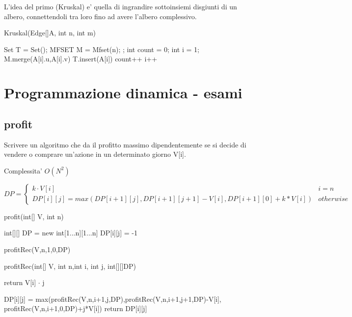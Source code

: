 \documentclass[oneside]{book}
\begin{document}
L'idea del primo (Kruskal) e' quella di ingrandire sottoinsiemi disgiunti di un albero, connettendoli tra loro fino ad avere l'albero complessivo.

\begin{algorithm}
\caption{Kruskal(Edge[]A, int n, int m)\label{alg:cap}}

\begin{algorithmic}
\State Set T = Set();
\State MFSET M = Mfset(n);
;
\State int count = 0;
\State int i = 1;
	\State M.merge(A[i].u,A[i].v)
	\State T.insert(A[i])
	\State count++
	\EndIf
	\State i++
\EndWhile

\end{algorithmic}
\end{algorithm}



\chapter{Programmazione dinamica - esami}
\section{profit}
Scrivere un algoritmo che da il profitto massimo dipendentemente se si decide di vendere o comprare un'azione in un determinato giorno V[i].

Complessita' $O(N^2)$

\begin{equation}
DP =
	\begin{cases}
		k \cdot V[i] & i = n \\
		DP[i][j] = max(DP[i+1][j], DP[i+1][j+1] - V[i], DP[i+1][0]+k*V[i]) & otherwise
	\end{cases}
\end{equation}

\begin{algorithm}
\caption{profit(int[] V, int n)}
\begin{algorithmic}
\State int[][] DP = new int[1...n][1...n]
		\State DP[i][j] = -1
	\EndFor
\EndFor

profitRec(V,n,1,0,DP)
\end{algorithmic}
\end{algorithm}


\begin{algorithm}
\caption{profitRec(int[] V, int n,int i, int j, int[][]DP)}
\begin{algorithmic}
	return V[i] $\cdot$ j
\EndIf

	\State DP[i][j] = max(profitRec(V,n,i+1,j,DP),profitRec(V,n,i+1,j+1,DP)-V[i], profitRec(V,n,i+1,0,DP)+j*V[i])
\EndIf
return DP[i][j]
\end{algorithmic}
\end{algorithm}
\end{document}
